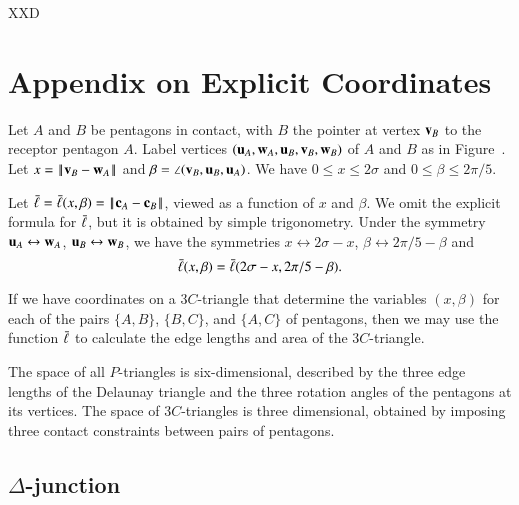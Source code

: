 XXD



\section{Appendix on Explicit Coordinates}

Let $A$ and $B$ be pentagons in contact, with $B$ the pointer at
vertex ${\mathbf v}_B$ to the receptor pentagon $A$.  Label vertices
$({\mathbf u}_A,{\mathbf w}_A,{\mathbf u}_B,{\mathbf v}_B,{\mathbf w}_B)$ of $A$ and $B$ as in
Figure~.  Let $x=\norm{\v_B}{\w_A}$ and $\beta =
\angle({\mathbf v}_B,{\mathbf u}_B,{\mathbf u}_A)$.  We have $0\le x\le 2\sigma$ and $0\le
\beta\le 2\pi/5$.



Let $\bl = \bl(x,\beta) = \norm{\c_A}{\c_B}$, viewed as a function of
$x$ and $\beta$.  We omit the explicit formula for $\bar\ell$, but it is
obtained by simple trigonometry.  Under the symmetry
${\mathbf u}_A\leftrightarrow {\mathbf w}_A$, ${\mathbf u}_B\leftrightarrow{\mathbf w}_B$, we have the
symmetries $x\leftrightarrow 2\sigma-x$, $\beta\leftrightarrow
2\pi/5-\beta$ and
\[
\bar\ell(x,\beta) = \bar\ell(2\sigma-x,2\pi/5 - \beta).
\]

If we have coordinates on a $3C$-triangle that determine the variables
$(x,\beta)$ for each of the pairs $\{A,B\}$, $\{B,C\}$, and $\{A,C\}$
of pentagons, then we may use the function $\bar\ell$ to calculate the edge
lengths and area of the $3C$-triangle.

The space of all $P$-triangles is six-dimensional, described by the
three edge lengths of the Delaunay triangle and the three rotation
angles of the pentagons at its vertices.  The space of $3C$-triangles
is three dimensional, obtained by imposing three contact constraints
between pairs of pentagons.

\subsection{$\Delta$-junction}

